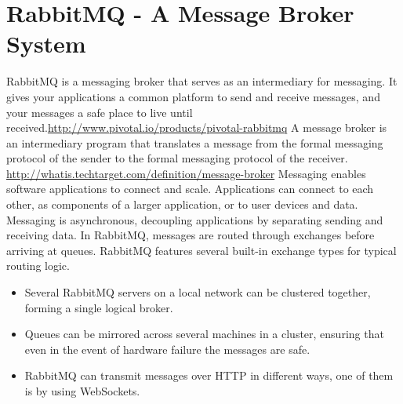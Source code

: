\section{RabbitMQ - A Message Broker System}
RabbitMQ is a messaging broker that serves as an intermediary for messaging. It gives your applications a common platform to send and receive messages, and your messages a safe place to live until received.\url{http://www.pivotal.io/products/pivotal-rabbitmq}
A message broker is an intermediary program that translates a message from the formal messaging protocol of the sender to the formal messaging protocol of the receiver. \url{http://whatis.techtarget.com/definition/message-broker}
Messaging enables software applications to connect and scale. Applications can connect to each other, as components of a larger application, or to user devices and data. Messaging is asynchronous, decoupling applications by separating sending and receiving data. In RabbitMQ, messages are routed through exchanges before arriving at queues. RabbitMQ features several built-in exchange types for typical routing logic.\cite{rabbitmqFeatures}
\begin{itemize}
  \item Several RabbitMQ servers on a local network can be clustered together, forming a single logical broker.
  \item Queues can be mirrored across several machines in a cluster, ensuring that even in the event of hardware failure the messages are safe.
  \item RabbitMQ can transmit messages over HTTP in different ways, one of them is by using WebSockets.
\end{itemize}

